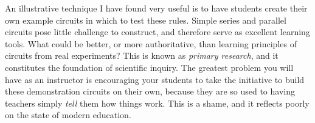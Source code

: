 An illustrative technique I have found very useful is to have students create their own example circuits in which to test these rules.  Simple series and parallel circuits pose little challenge to construct, and therefore serve as excellent learning tools.  What could be better, or more authoritative, than learning principles of circuits from real experiments?  This is known as {\it primary research}, and it constitutes the foundation of scientific inquiry.  The greatest problem you will have as an instructor is encouraging your students to take the initiative to build these demonstration circuits on their own, because they are so used to having teachers simply {\it tell} them how things work.  This is a shame, and it reflects poorly on the state of modern education.




